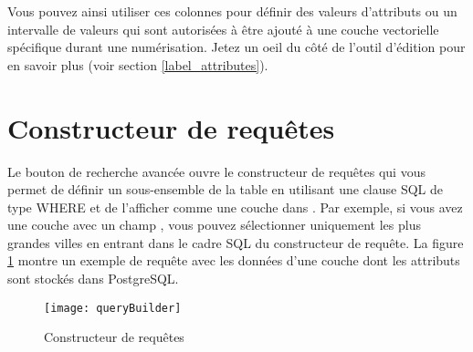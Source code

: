 Vous pouvez ainsi utiliser ces colonnes pour définir des valeurs d'attributs ou un intervalle de valeurs qui sont autorisées à être ajouté à une couche vectorielle spécifique durant une numérisation. Jetez un oeil du côté de l'outil d'édition pour en savoir plus (voir section \ref{label_attributes}).

\section{Constructeur de requêtes}\label{sec:query_builder}


Le bouton de recherche avancée ouvre le constructeur de requêtes qui vous permet de définir un sous-ensemble de la table en utilisant une clause SQL de type WHERE et de l'afficher comme une couche dans \qg. Par exemple, si vous avez une couche  avec un champ , vous pouvez sélectionner uniquement les plus grandes villes en entrant  dans le cadre SQL du constructeur de requête. La figure \ref{fig:query_builder} montre un exemple de requête avec les données d'une couche \pg dont les attributs sont stockés dans PostgreSQL.

\begin{figure}[ht]
  \begin{center}
    \texttt{[image: queryBuilder]}
    \caption{Constructeur de requêtes \nixcaption} \label{fig:query_builder}
  \end{center}
\end{figure}

